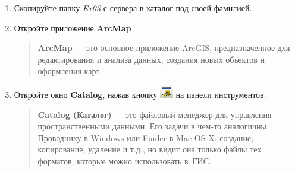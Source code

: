 \documentclass[]{book}
\theoremstyle{definition}
\theoremstyle{definition}
\theoremstyle{definition}
\theoremstyle{remark}
\begin{document}
\begin{enumerate}
\def\labelenumi{\arabic{enumi}.}
\item
  Скопируйте папку \emph{Ex03} с сервера в каталог под своей фамилией.
\item
  Откройте приложение \textbf{ArcMap}

  \begin{quote}
  \textbf{ArcMap} --- это основное приложение ArcGIS, предназначенное
  для редактирования и анализа данных, создания новых объектов и
  оформления карт.
  \end{quote}
\item
  Откройте окно \textbf{Catalog}, нажав кнопку
  \includegraphics{images/Ex03/image2.png} на панели инструментов.

  \begin{quote}
  \textbf{Catalog (Каталог)} --- это файловый менеджер для управления
  пространственными данными. Его задачи в чем-то аналогичны Проводнику в
  Windows или Finder в Mac OS X: создание, копирование, удаление и т.д.,
  но видит она только файлы тех форматов, которые можно использовать
  в~ГИС.
  \end{quote}


\end{enumerate}
\end{document}

